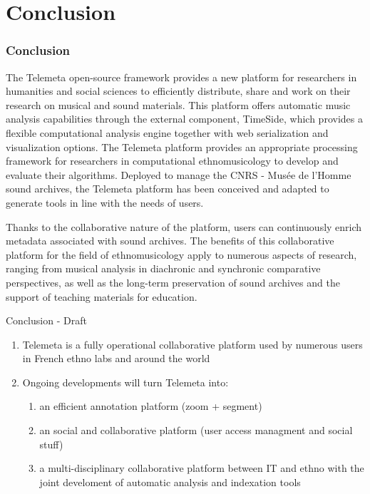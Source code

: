 \documentclass[final, hyperref, table]{beamer}
\begin{document}
\section{Conclusion}
\begin{frame}\frametitle{Conclusion}
  The Telemeta open-source framework provides a new platform for researchers in humanities and social sciences to efficiently distribute, share and work on their research on musical and sound materials. 
This platform offers automatic music analysis capabilities through the external component, TimeSide, which provides a flexible computational analysis engine together with web serialization and visualization options. 
The Telemeta platform provides an appropriate processing framework for researchers in computational ethnomusicology to develop and evaluate their algorithms. 
Deployed to manage the CNRS - Musée de l’Homme sound archives, the Telemeta platform has been conceived and adapted to generate tools in line with the needs of users. 

Thanks to the collaborative nature of the platform, users can continuously enrich metadata associated with sound archives. 
The benefits of this collaborative platform for the field of ethnomusicology apply to numerous aspects of research, ranging from musical analysis in diachronic and synchronic comparative perspectives, as well as the long-term preservation of sound archives and the support of teaching materials for education. 

\end{frame}
\begin{frame}{Conclusion - Draft}
  \begin{enumerate}
  \item Telemeta is a fully operational collaborative platform used
    by numerous users in French ethno labs and around the world


  \item Ongoing developments will turn Telemeta into:
    \begin{enumerate}
    \item an efficient annotation platform (zoom + segment)
    \item an social and collaborative platform (user access managment and social stuff)
    \item a multi-disciplinary collaborative platform between IT and ethno with the joint develoment of automatic analysis and indexation tools
    \end{enumerate}
  \end{enumerate}

\end{frame}
\end{document}
